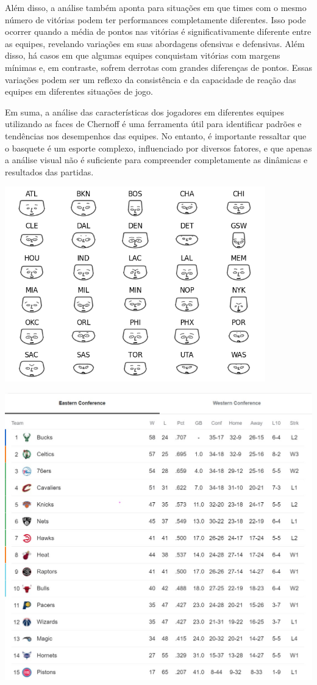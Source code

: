 \documentclass[
]{book}
\begin{document}
Além disso, a análise também aponta para situações em que times com o mesmo número de vitórias podem ter performances completamente diferentes. Isso pode ocorrer quando a média de pontos nas vitórias é significativamente diferente entre as equipes, revelando variações em suas abordagens ofensivas e defensivas. Além disso, há casos em que algumas equipes conquistam vitórias com margens mínimas e, em contraste, sofrem derrotas com grandes diferenças de pontos. Essas variações podem ser um reflexo da consistência e da capacidade de reação das equipes em diferentes situações de jogo.

Em suma, a análise das características dos jogadores em diferentes equipes utilizando as faces de Chernoff é uma ferramenta útil para identificar padrões e tendências nos desempenhos das equipes. No entanto, é importante ressaltar que o basquete é um esporte complexo, influenciado por diversos fatores, e que apenas a análise visual não é suficiente para compreender completamente as dinâmicas e resultados das partidas.

\includegraphics[width=4.44792in,height=\textheight]{imagens/20.png}

\includegraphics[width=5.91667in,height=\textheight]{imagens/21.jpeg}
\end{document}
